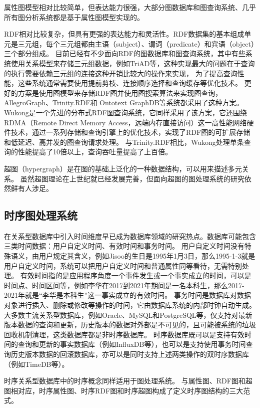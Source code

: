 属性图模型相对比较简单，但表达能力很强，大部分图数据库和图查询系统、几乎所有图分析系统都是基于属性图模型实现的。

RDF相对比较复杂，但具有更强的表达能力和灵活性。RDF数据集的基本组成单元是三元组，每个三元组都由主语（subject）、谓词（predicate）和宾语（object）三个部分组成。
目前已经有不少面向RDF的图数据库和图查询系统，其中有些系统使用关系模型来存储三元组数据，例如TriAD\cite{triad}等，这种实现最大的问题在于查询的执行需要依赖三元组的连接这种开销比较大的操作来实现，
为了提高查询性能，这些系统通常需要使用提前剪枝、连接顺序选择和查询缓存等优化技术。
更好的方案是使用图模型来存储RDF图并使用图搜索算法来实现图查询，AllegroGraph\cite{allegro}、Trinity.RDF\cite{trinity}和 Ontotext GraphDB\cite{graphdb}等系统都采用了这种方案。
Wukong\cite{wukong}是一个先进的分布式RDF图查询系统，它同样采用了该方案，它还围绕RDMA（Remote Direct Memory Access，远端内存直接访问）这一高性能网络硬件技术，通过一系列存储和查询引擎上的优化技术，实现了RDF图的可扩展存储和低延迟、高并发的图查询请求处理。
与Trinity.RDF相比，Wukong处理单条查询的性能提高了10倍以上，查询吞吐量提高了上百倍。

超图（hypergraph）是在图的基础上泛化的一种数据结构，可以用来描述多元关系。
虽然超图理论在上世纪就已经发展完善，但面向超图的图处理系统的研究依然鲜有人涉足。

\subsection{时序图处理系统}
在关系型数据库中引入时间维度早已成为数据库领域的研究热点\cite{599934}\cite{tdb}\cite{itd}。数据库可能包含三类时间数据：用户自定义时间、有效时间和事务时间。
用户自定义时间没有特殊语义，由用户规定其含义，例如Jisoo的生日是1995年1月3日，那么1995-1-3就是用户自定义时间，系统可以把用户自定义时间和普通属性同等看待，无需特别处理。
有效时间指的是应用程序角度一个事件发生或一个事实成立的时间，可以是时间点、时间区间等，例如李华在2017到2021年期间是一名本科生，那么2017-2021年就是“李华是本科生”这一事实成立的有效时间。
事务时间是数据库对数据对象进行插入、删除或修改等操作的时间，它由数据库系统的内部时钟自动生成。
大多数主流关系型数据库，例如Oracle、MySQL和PostgreSQL等，仅支持对最新版本数据的查询和更新，历史版本的数据对外部是不可见的，且可能被系统的垃圾回收机制清理，这类数据库都是非时序数据库。
时序数据库既可以是支持有效时间的查询和更新的事实数据库（例如InfluxDB\cite{influx}等），也可以是支持使用事务时间查询历史版本数据的回滚数据库，亦可以是同时支持上述两类操作的双时序数据库（例如TimeDB\cite{timedb}等）。

时序关系型数据库中的时序概念同样适用于图处理系统。
与属性图、RDF图和超图相对应，时序属性图、时序RDF图和时序超图构成了定义时序图结构的三大范式。

